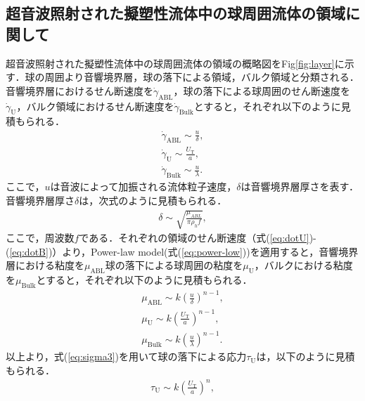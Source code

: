 \subsection{超音波照射された擬塑性流体中の球周囲流体の領域に関して}
超音波照射された擬塑性流体中の球周囲流体の領域の概略図をFig\ref{fig:layer}に示す．球の周囲より音響境界層，球の落下による領域，バルク領域と分類される．音響境界層におけるせん断速度を$\dot{\gamma}_\text{ABL}$，球の落下による球周囲のせん断速度を$\dot{\gamma}_\text{U}$，バルク領域におけるせん断速度を$\dot{\gamma}_\text{Bulk}$とすると，それぞれ以下のように見積もられる．
\begin{eqnarray}
    \dot{\gamma}_\text{ABL} \sim \frac{u}{\delta} , \label{eq:dotU}\\
    \dot{\gamma}_\text{U} \sim \frac{U_\text{T}}{a} , \label{eq:UTgamma} \\
    \dot{\gamma}_\text{Bulk} \sim \frac{u}{\lambda} . \label{eq:dotB}
\end{eqnarray}
ここで，$u$は音波によって加振される流体粒子速度，$\delta$は音響境界層厚さを表す．音響境界層厚さ$\delta$は，次式のように見積もられる\cite{deshpande2001vibrational,wiklund2012acoustofluidics}．
\begin{eqnarray}
    \delta \sim \sqrt{\frac{\mu_{ABL}}{\pi \rho_h f}} ,
    \label{eq:delta2}
\end{eqnarray}
ここで，周波数$f$である．それぞれの領域のせん断速度（式(\ref{eq:dotU})-(\ref{eq:dotB})）より，Power-law model(式(\ref{eq:power-low}))を適用すると，音響境界層における粘度を$\mu_\text{ABL}$球の落下による球周囲の粘度を$\mu_\text{U}$，バルクにおける粘度を$\mu_\text{Bulk}$とすると，それぞれ以下のように見積もられる．
\begin{eqnarray}
    \mu_\text{ABL} \sim k\left(\frac{u}{\delta}\right)^{n-1} , \label{eq:muABL} \\
    \mu_\text{U} \sim k \left(\frac{U_\text{T}}{a}\right)^{n-1} ,\label{eq:muU} \\
    \mu_\text{Bulk} \sim k \left(\frac{u}{\lambda}\right)^{n-1} . \label{eq:Bulk}
\end{eqnarray}
以上より，式(\ref{eq:sigma3})を用いて球の落下による応力$\tau_\text{U}$は，以下のように見積もられる．
\begin{eqnarray}
    \tau_\text{U} \sim k \left(\frac{U_\text{T}}{a}\right)^n ,
    \label{eq:tauU}
\end{eqnarray}

